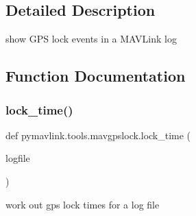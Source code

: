\subsection{Detailed Description}
\begin{DoxyVerb}show GPS lock events in a MAVLink log
\end{DoxyVerb}
 

\subsection{Function Documentation}
\mbox{\label{namespacepymavlink_1_1tools_1_1mavgpslock_ae6a0ce5a3f2fe9b9606f2e60149a3da6}} 
\subsubsection{\texorpdfstring{lock\+\_\+time()}{lock\_time()}}
{\footnotesize\ttfamily def pymavlink.\+tools.\+mavgpslock.\+lock\+\_\+time (\begin{DoxyParamCaption}\item[{}]{logfile }\end{DoxyParamCaption})}

\begin{DoxyVerb}work out gps lock times for a log file\end{DoxyVerb}
 